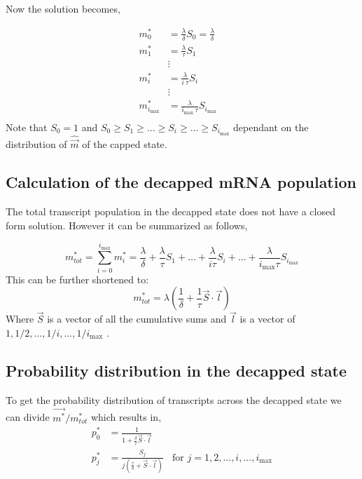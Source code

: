 \documentclass[review]{elsarticle}
\newcommand{\imax}{\ensuremath{{i_{\max}}}\xspace}
\newcommand{\mvec}{\ensuremath{\vec{m}}\xspace}
\newcommand{\mvechat}{\ensuremath{\hat{\mvec}}\xspace}
\begin{document}
Now the solution becomes,

\begin{align} \label{eq:decapped_solution} 
m_{0}^{*}  &= \frac{\lambda}{\delta}S_{0}=\frac{\lambda}{\delta} \\ \nonumber
m_{1}^{*}  &= \frac{\lambda}{\tau}S_{1} \\ \nonumber
& \vdots & \\ \nonumber
m_{i}^{*}  &= \frac{\lambda}{i \: \tau}S_{i}  \\ \nonumber
& \vdots & \\ \nonumber
m_{\imax}^{*}  &= \frac{\lambda}{\imax \: \tau}S_{\imax}  \\ \nonumber
\end{align}
 Note that $S_{0}=1$ and $ S_{0} \ge S_{1} \ge ... \ge S_{i} \ge ... \ge S_{\imax}$ dependant on the distribution of \mvechat of the capped state. %

\subsection{Calculation of the decapped mRNA population}

The total transcript population in the decapped state does not have a closed form solution. However it can be summarized as follows,

\begin{equation*}
	m_{tot}^{*} = \sum_{i=0}^{\imax} m_{i}^{*} = \frac{\lambda}{\delta} + \frac{\lambda}{\tau}S_{1} + \hdots + \frac{\lambda}{i \tau}S_{i} + \hdots  + \frac{\lambda}{\imax \tau}S_{\imax} 
\end{equation*}
This can be further shortened to:
\begin{equation} \label{eq: marked_total_pop}
	m_{tot}^{*} = \lambda(\frac{1}{\delta} + \frac{1}{\tau}\vec{S} \cdot \vec{l}	) 
\end{equation}
Where $\vec{S}$ is a vector of all the cumulative sums and $\vec{l}$ is a vector of $1,1/2,...,1/i,...,1/\imax$ . 

\subsection{Probability distribution in the decapped state}

To get the probability distribution of transcripts across the decapped state we can divide $\vec{m^{*}}/m_{tot}^{*}$ which results in,
\begin{align}\label{eq:decapped_distribution}
	p_{0}^{*} &= \frac{1}{1 + \frac{\delta}{\tau}\vec{S} \cdot \vec{l}}	\\
  	p_{j}^{*} &= \frac{S_{j}}{j(\frac{\tau}{\delta} + \vec{S} \cdot \vec{l})}	\:\:\:\: \text{for } j=1, 2, ..., i, ..., \imax
\end{align}
\end{document}
